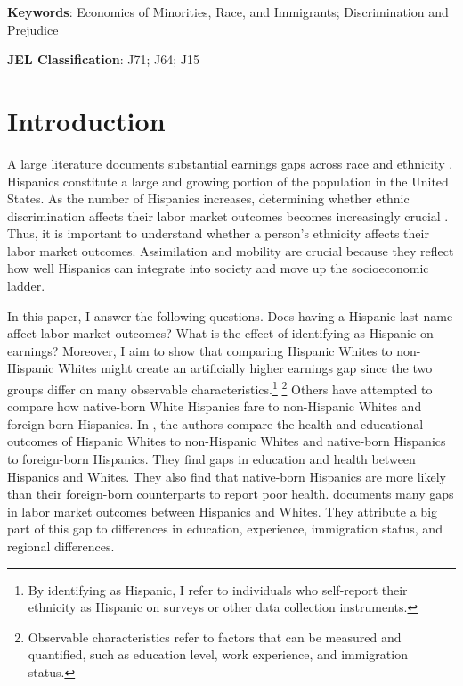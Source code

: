 \documentclass[12pt,english]{article}
\begin{document}
\noindent\textbf{Keywords}: Economics of Minorities, Race, and Immigrants; Discrimination and Prejudice

\noindent\textbf{JEL Classification}: J71; J64; J15

\vfill
\pagebreak{}

\section{Introduction}\label{sec:intro}

A large literature documents substantial earnings gaps across race and ethnicity \autocite{bayer2018divergent, charles2008prejudice, card1992school, fryer2004causes, rubinstein2014pride, bertrand2004emily, juhn1991accounting}. Hispanics constitute a large and growing portion of the population in the United States. As the number of Hispanics increases, determining whether ethnic discrimination affects their labor market outcomes becomes increasingly crucial \autocite{chettyUnitedStatesStill2014, chettyEffectsExposureBetter2016,chettyFadingAmericanDream2017,abramitzkyImmigrantsAssimilateMore2020a, abramitzkyNationImmigrantsAssimilation2014,abramitzkyCulturalAssimilationAge2016,chettyWhereLandOpportunity2014}. Thus, it is important to understand whether a person's ethnicity affects their labor market outcomes. Assimilation and mobility are crucial because they reflect how well Hispanics can integrate into society and move up the socioeconomic ladder.

In this paper, I answer the following questions. Does having a Hispanic last name affect labor market outcomes? What is the effect of identifying as Hispanic on earnings? Moreover, I aim to show that comparing Hispanic Whites to non-Hispanic Whites might create an artificially higher earnings gap since the two groups differ on many observable characteristics.\footnote{By identifying as Hispanic, I refer to individuals who self-report their ethnicity as Hispanic on surveys or other data collection instruments.} \footnote{Observable characteristics refer to factors that can be measured and quantified, such as education level, work experience, and immigration status.} Others have attempted to compare how native-born White Hispanics fare to non-Hispanic Whites and foreign-born Hispanics. In \textcite{antman2020ethnic,antmanEthnicAttritionObserved2016,antmanEthnicAttritionObserved2016a,antmanEthnicAttritionAssimilation2020}, the authors compare the health and educational outcomes of Hispanic Whites to non-Hispanic Whites and native-born Hispanics to foreign-born Hispanics. They find gaps in education and health between Hispanics and Whites. They also find that native-born Hispanics are more likely than their foreign-born counterparts to report poor health. \textcite{davilaChangesRelativeEarnings2008} documents many gaps in labor market outcomes between Hispanics and Whites. They attribute a big part of this gap to differences in education, experience, immigration status, and regional differences. 
\end{document}
